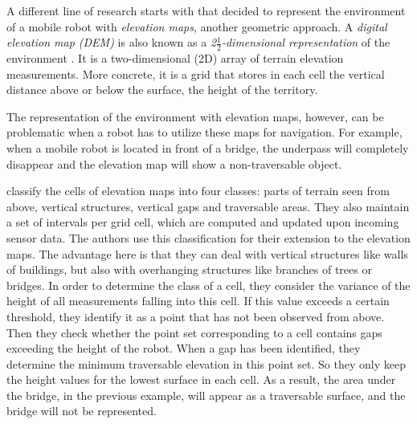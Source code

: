 \documentclass[12pt,a4paper,table,dvipsnames,tikz]{report}
\newcommand{\term}{\textit}
\newcommand{\acronym}{\MakeUppercase}
\newcommand{\itfrac}[2]{\frac{\textit{#1}}{\textit{#2}}}
\begin{document}
	A different line of research starts with \citet{Pfaff} that decided to represent 
	the environment of a mobile robot with \term{elevation maps}, another geometric 
	approach. A \term{digital elevation map (\acronym{dem})} \citep{Kweon} is also 
	known as a \term{2\(\itfrac{1}{2}\)-dimensional representation} of the environment 
	\citep{Pfaff}. It is a two-dimensional (\acronym{2d}) array of terrain elevation 
	measurements. More concrete, it is a grid that stores in each cell the vertical 
	distance above or below the surface, the height of the territory. 
	\par 
	The representation of the environment with elevation maps, however, can 
	be problematic when a robot has to utilize these maps for navigation. For 
	example, when a mobile robot is located in front of a bridge, the underpass will 
	completely disappear and the elevation map will show a non-traversable 
	object.
	\par
	\citet{Pfaff} classify the cells of elevation maps into four classes: 
	parts of terrain seen from above, vertical structures, vertical gaps and 
	traversable areas. They also maintain a set of intervals per grid cell, which 
	are computed and updated upon incoming sensor data. The authors use this 
	classification for their extension to the elevation maps. The advantage here is 
	that they can deal with vertical structures like walls of buildings, but also 
	with overhanging structures like branches of trees or bridges. In order to 
	determine the class of a cell, they consider the variance of the height of all 
	measurements falling into this cell. If this value exceeds a certain threshold, 
	they identify it as a point that has not been observed from above. Then they 
	check whether the point set corresponding to a cell	contains gaps exceeding the 
	height of the robot. When a gap has been identified, they determine the	minimum 
	traversable elevation in this point set. So they only keep the height values for 
	the lowest surface in each cell. As a result, the area under the bridge, in the 
	previous example, will appear as a traversable surface, and the bridge will not 
	be represented.
	\\
	
\end{document}
